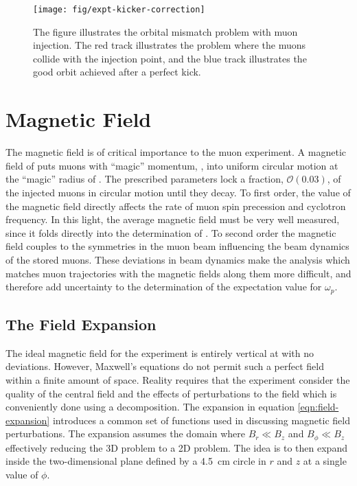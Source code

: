 \begin{figure}
\centering
\texttt{[image: fig/expt-kicker-correction]}
\caption{The figure illustrates the orbital mismatch problem with muon injection.  The red track illustrates the problem where the muons collide with the injection point, and the blue track illustrates the good orbit achieved after a perfect kick. \label{fig:expt-kicker-correction}}
\end{figure}

\section{Magnetic Field} \label{sec:magnetic-field}

The magnetic field is of critical importance to the muon \gmtwo experiment.  A magnetic field of \bmagic puts muons with ``magic'' momentum, \pmagic, into uniform circular motion at the ``magic'' radius of \rmagic.  The prescribed parameters lock a fraction, $\mathcal{O}(0.03)$, of the injected muons in circular motion until they decay.  To first order, the value of the magnetic field directly affects the rate of muon spin precession and cyclotron frequency.  In this light, the average magnetic field must be very well measured, since it folds directly into the determination of \wa.  To second order the magnetic field couples to the symmetries in the muon beam influencing the beam dynamics of the stored muons.  These deviations in beam dynamics make the analysis which matches muon trajectories with the magnetic fields along them more difficult, and therefore add uncertainty to the determination of the expectation value for $\omega_p$.

\subsection{The Field Expansion}

The ideal magnetic field for the experiment is entirely vertical at \bmagic with no deviations.  However, Maxwell's equations do not permit such a perfect field within a finite amount of space.  Reality requires that the experiment consider the quality of the central field and the effects of perturbations to the field which is conveniently done using a decomposition.  The expansion in equation \ref{eqn:field-expansion} introduces a common set of functions used in discussing magnetic field perturbations.  The expansion assumes the domain where $B_r \ll B_z$ and $B_\phi \ll B_z$ effectively reducing the 3D problem to a 2D problem.  The idea is to then expand inside the two-dimensional plane defined by a \SI{4.5}{\cm} circle in $r$ and $z$ at a single value of $\phi$.

